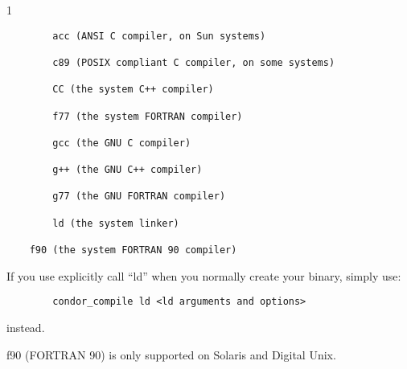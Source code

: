 \begin{ManPage}{\label{man-condor-compile}}{1}
\begin{verbatim}
        acc (ANSI C compiler, on Sun systems) 

        c89 (POSIX compliant C compiler, on some systems) 

        CC (the system C++ compiler) 

        f77 (the system FORTRAN compiler) 

        gcc (the GNU C compiler) 

        g++ (the GNU C++ compiler) 

        g77 (the GNU FORTRAN compiler) 

        ld (the system linker) 

	f90 (the system FORTRAN 90 compiler)
\end{verbatim}

\Note If you use explicitly call ``ld'' when you normally create
your binary, simply use:
\begin{verbatim}
        condor_compile ld <ld arguments and options>
\end{verbatim}
instead.  

\Note f90 (FORTRAN 90) is only supported on Solaris and Digital Unix. 

\end{ManPage}
